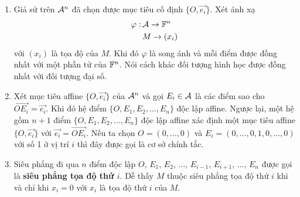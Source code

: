 \begin{remark}
    \begin{enumerate}
        \item Giả sử trên $\mathcal{A}^n$ đã chọn được mục tiêu cố định $\{O, \overrightarrow{e_i}\}$. Xét ánh xạ 
        \begin{align*}
            \varphi: \, & \mathcal{A} \to \mathbb{F}^n \\ & M \to (x_i)
        \end{align*}
        với $(x_i)$ là tọa độ của $M$. Khi đó $\varphi$ là song ánh và mỗi điểm được đồng nhất với một phần tử của $\mathbb{F}^n$. Nói cách khác đối tượng hình học được đồng nhất với đối tượng đại số.
        \item Xét mục tiêu affine $\{O, \overrightarrow{e_i}\}$ của $\mathcal{A}^n$ và gọi $E_i \in \mathcal{A}$ là các điểm sao cho $\overrightarrow{OE_i} = \overrightarrow{e_i}$. Khi đó hệ điểm $\{O, E_1, E_2, \ldots, E_n\}$ độc lập affine. Ngược lại, một hệ gồm $n+1$ điểm $\{O, E_1, E_2, \ldots, E_n\}$ độc lập affine xác định một mục tiêu affine $\{O, \overrightarrow{e_i}\}$ với $\overrightarrow{e_i} = \overrightarrow{OE_i}$. Nếu ta chọn $O = (0, \ldots, 0)$ và $E_i = (0, \ldots, 0, 1, 0, \ldots, 0)$ với số 1 ở vị trí $i$ thì đây được gọi là cơ sở chính tắc.
        \item Siêu phẳng đi qua $n$ điểm độc lập $O$, $E_1$, $E_2$, ..., $E_{i-1}$, $E_{i+1}$, ..., $E_n$ được gọi là \textbf{siêu phẳng tọa độ thứ $i$}. Dễ thấy $M$ thuộc siêu phẳng tọa độ thứ $i$ khi và chỉ khi $x_i = 0$ với $x_i$ là tọa độ thứ $i$ của $M$.
    \end{enumerate}
\end{remark}